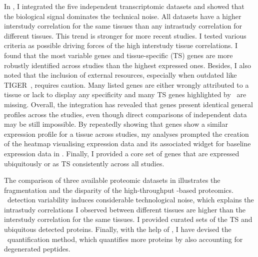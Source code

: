 In ,
I integrated the five independent transcriptomic datasets and
showed that the biological signal dominates the technical noise.
All datasets have a higher interstudy correlation for the same tissues
than any intrastudy correlation for different tissues.
This trend is stronger for more recent studies.
I tested various criteria as possible driving forces
of the high interstudy tissue correlations.
I found that the most variable genes and tissue-specific (\gls{TS}) genes
are more robustly identified across studies
than the highest expressed ones.
Besides, I also noted that
the inclusion of external resources,
especially when outdated like \gls{TIGER}~,
requires caution.
Many listed genes are either wrongly attributed to a tissue
or lack to display any specificity and
many \gls{TS} genes highlighted by \Rnaseq\ are missing.
Overall, the integration has revealed that
genes present identical general profiles across the studies,
even though direct comparisons of independent data may be still impossible.
By repeatedly showing that
genes show a similar expression profile for a tissue across studies,
my analyses prompted the creation of the heatmap visualising expression data
and its associated widget for baseline expression data in
.
Finally, I provided a core set of genes that are expressed
ubiquitously or as \gls{TS} consistently across all studies.\mybr\

The comparison of three available proteomic datasets
in  illustrates
the fragmentation and the disparity of the high-throughput \ms{}-based proteomics.
\ms\ detection variability induces considerable technological noise,
which explains
the intrastudy correlations I observed between different tissues are
higher than the interstudy correlation for the same tissues.
I provided curated sets of the \gls{TS} and ubiquitous detected proteins.
Finally, with the help of \james,
I have devised the \PPKM\ quantification method,
which quantifies more proteins by also accounting for degenerated peptides.\mybr\

